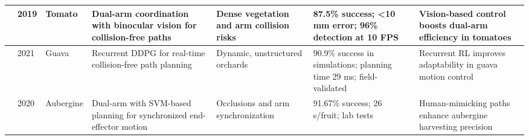 \documentclass{ieeeaccess}
\begin{document}
\begin{table}[htbp]
\begin{tabular}{p{} p{} p{} p{} p{} p{} p{}}
\cite{ling2019dual} & 2019 & Tomato & Dual-arm coordination with binocular vision for collision-free paths & Dense vegetation and arm collision risks & 87.5\% success; <10 mm error; 96\% detection at 10 FPS & Vision-based control boosts dual-arm efficiency in tomatoes \\ \midrule
\cite{lin2021collision} & 2021 & Guava & Recurrent DDPG for real-time collision-free path planning & Dynamic, unstructured orchards & 90.9\% success in simulations; planning time 29 ms; field-validated & Recurrent RL improves adaptability in guava motion control \\ \midrule
\cite{sepulveda2020robotic} & 2020 & Aubergine & Dual-arm with SVM-based planning for synchronized end-effector motion & Occlusions and arm synchronization & 91.67\% success; 26 s/fruit; lab tests & Human-mimicking paths enhance aubergine harvesting precision \\ \midrule


\end{tabular}
\end{table}
\end{document}
